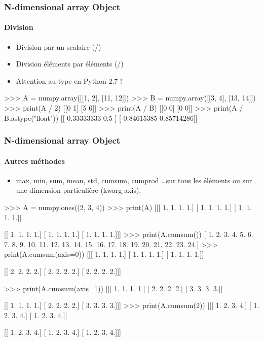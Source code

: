 \begin{frame}[fragile]
\frametitle{N-dimensional array Object}
\framesubtitle{Division}
\begin{itemize}
 \item Division par un scalaire (/)
 \item Division éléments par éléments (/) 
 \item Attention au type en Python 2.7 ! 
\end{itemize}
\begin{pythonConsole}
>>> A = numpy.array([[1, 2], [11, 12]])
>>> B = numpy.array([[3, 4], [13, 14]])
>>> print(A / 2)
[[0 1]
 [5 6]]
>>> print(A / B)
[[0 0]
 [0 0]]
>>> print(A / B.astype("float"))
[[ 0.33333333  0.5       ]
 [ 0.84615385  0.85714286]]
\end{pythonConsole}
\end{frame}
\begin{frame}[fragile]
\frametitle{N-dimensional array Object}
\framesubtitle{Autres méthodes}
\begin{itemize}
 \item max, min, sum, mean, std, cumsum, cumprod \dots sur tous les éléments ou sur une dimension particulière (kwarg axis). 
\end{itemize}
\begin{minipage}{5cm}
\begin{pythonConsole}
>>> A = numpy.ones((2, 3, 4))
>>> print(A)
[[[ 1.  1.  1.  1.]
  [ 1.  1.  1.  1.]
  [ 1.  1.  1.  1.]]

 [[ 1.  1.  1.  1.]
  [ 1.  1.  1.  1.]
  [ 1.  1.  1.  1.]]]
>>> print(A.cumsum())
[  1.   2.   3.   4.   5.   6.   7.   8.   9.  10.  11.  12.  13.  14.  15. 
  16.  17.  18.  19.  20.  21.  22.  23.  24.]
>>> print(A.cumsum(axis=0))
[[[ 1.  1.  1.  1.]
  [ 1.  1.  1.  1.]
  [ 1.  1.  1.  1.]]

 [[ 2.  2.  2.  2.]
  [ 2.  2.  2.  2.]
  [ 2.  2.  2.  2.]]]
\end{pythonConsole}
\end{minipage}
\begin{minipage}{5cm}
\begin{pythonConsole}
>>> print(A.cumsum(axis=1))
[[[ 1.  1.  1.  1.]
  [ 2.  2.  2.  2.]
  [ 3.  3.  3.  3.]]

 [[ 1.  1.  1.  1.]
  [ 2.  2.  2.  2.]
  [ 3.  3.  3.  3.]]]
>>> print(A.cumsum(2))
[[[ 1.  2.  3.  4.]
  [ 1.  2.  3.  4.]
  [ 1.  2.  3.  4.]]

 [[ 1.  2.  3.  4.]
  [ 1.  2.  3.  4.]
  [ 1.  2.  3.  4.]]]
\end{pythonConsole}
\end{minipage}
\end{frame}
